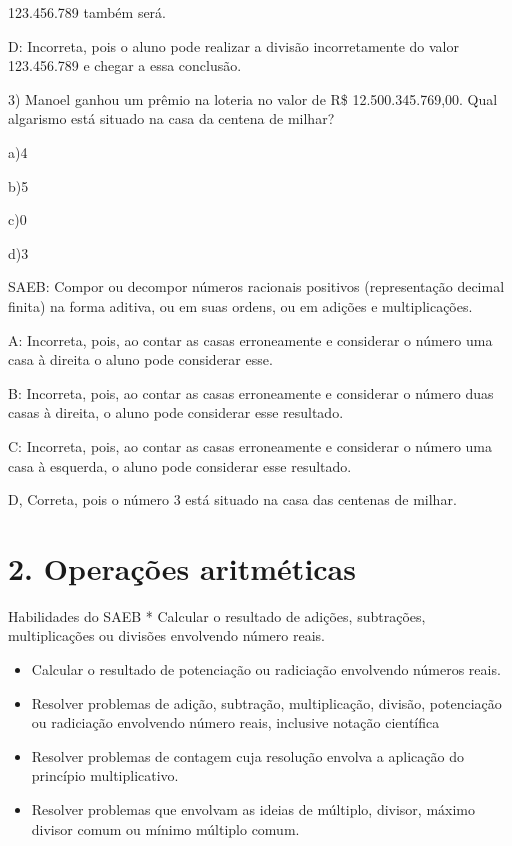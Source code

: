 123.456.789 também será.

D: Incorreta, pois o aluno pode realizar a divisão incorretamente do
valor 123.456.789 e chegar a essa conclusão.

3) Manoel ganhou um prêmio na loteria no valor de R\$ 12.500.345.769,00.
Qual algarismo está situado na casa da centena de milhar?

a)4

b)5

c)0

d)3

SAEB: Compor ou decompor números racionais positivos (representação
decimal finita) na forma aditiva, ou em suas ordens, ou em adições e
multiplicações.

A: Incorreta, pois, ao contar as casas erroneamente e considerar o
número uma casa à direita o aluno pode considerar esse.

B: Incorreta, pois, ao contar as casas erroneamente e considerar o
número duas casas à direita, o aluno pode considerar esse resultado.

C: Incorreta, pois, ao contar as casas erroneamente e considerar o
número uma casa à esquerda, o aluno pode considerar esse resultado.

D, Correta, pois o número 3 está situado na casa das centenas de milhar.

\hypertarget{operauxe7uxf5es-aritmuxe9ticas}{%
\section{2. Operações
aritméticas}\label{operauxe7uxf5es-aritmuxe9ticas}}

Habilidades do SAEB * Calcular o resultado de adições, subtrações,
multiplicações ou divisões envolvendo número reais.

\begin{itemize}
\item
  Calcular o resultado de potenciação ou radiciação envolvendo números
  reais.
\item
  Resolver problemas de adição, subtração, multiplicação, divisão,
  potenciação ou radiciação envolvendo número reais, inclusive notação
  científica
\item
  Resolver problemas de contagem cuja resolução envolva a aplicação do
  princípio multiplicativo.
\item
  Resolver problemas que envolvam as ideias de múltiplo, divisor, máximo
  divisor comum ou mínimo múltiplo comum.
\end{itemize}

